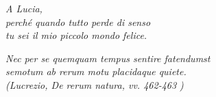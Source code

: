 \begin{flushright}
  \emph{A Lucia, \\
  perch\'{e} quando tutto perde di senso \\
  tu sei il mio piccolo mondo felice.}
  
  \vspace{10cm}
  
   \emph{
   Nec per se quemquam tempus sentire fatendumst \\
   semotum ab rerum motu placidaque quiete. \\
   (Lucrezio, De rerum natura, vv. 462-463 )
   } 
\end{flushright}

\cleardoublepage
